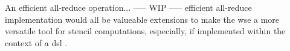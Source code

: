 An efficient all-reduce operation... 
----- WIP -----
efficient all-reduce implementation would all be valueable extensions to make the \ac{wse} a more versatile tool for stencil computations, especially, if implemented within the context of a \ac{dsl} \cite{woo2022disruptive,sai2024automated}.


